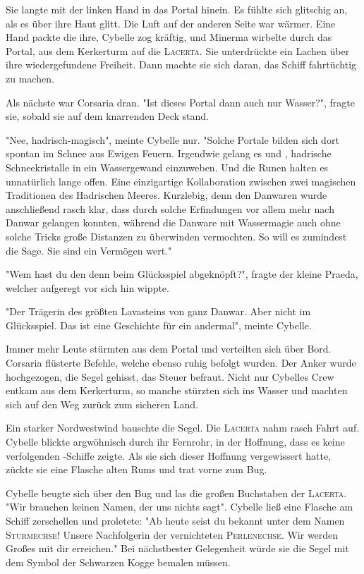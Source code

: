 Sie langte mit der linken Hand in das Portal hinein. Es fühlte sich glitschig an, als es über ihre Haut glitt. Die Luft auf der anderen Seite war wärmer. Eine Hand packte die ihre, Cybelle zog kräftig, und Minerma wirbelte durch das Portal, aus dem Kerkerturm auf die \textsc{Lacerta}. Sie unterdrückte ein Lachen über ihre wiedergefundene Freiheit. Dann machte sie sich daran, das Schiff fahrtüchtig zu machen.

Als nächste war Corsaria dran. "Ist dieses Portal dann auch nur Wasser?", fragte sie, sobald sie auf dem knarrenden Deck stand.

"Nee, hadrisch-magisch", meinte Cybelle nur. "Solche Portale bilden sich dort spontan im Schnee aus Ewigen Feuern. Irgendwie gelang es  und , hadrische Schneekristalle in ein Wassergewand einzuweben. Und die Runen halten es unnatürlich lange offen. Eine einzigartige Kollaboration zwischen zwei magischen Traditionen des Hadrischen Meeres. Kurzlebig, denn den Danwaren wurde anschließend rasch klar, dass durch solche Erfindungen vor allem mehr  nach Danwar gelangen konnten, während die Danware mit Wassermagie auch ohne solche Tricks große Distanzen zu überwinden vermochten. So will es zumindest die Sage. Sie sind ein Vermögen wert."

"Wem hast du den denn beim Glücksspiel abgeknöpft?", fragte der kleine Praeda, welcher aufgeregt vor sich hin wippte. 

"Der Trägerin des größten Lavasteins von ganz Danwar. Aber nicht im Glücksspiel. Das ist eine Geschichte für ein andermal", meinte Cybelle.

Immer mehr Leute stürmten aus dem Portal und verteilten sich über Bord. Corsaria flüsterte Befehle, welche ebenso ruhig befolgt wurden. Der Anker wurde hochgezogen, die Segel gehisst, das Steuer befraut. Nicht nur Cybelles Crew entkam aus dem Kerkerturm, so manche stürzten sich ins Wasser und machten sich auf den Weg zurück zum sicheren Land.

Ein starker Nordwestwind bauschte die Segel. Die \textsc{Lacerta} nahm rasch Fahrt auf. Cybelle blickte argwöhnisch durch ihr Fernrohr, in der Hoffnung, dass es keine verfolgenden -Schiffe zeigte. Als sie sich dieser Hoffnung vergewissert hatte, zückte sie eine Flasche alten Rums und trat vorne zum Bug.

Cybelle beugte sich über den Bug und las die großen Buchstaben der \textsc{Lacerta}. 
"Wir brauchen keinen Namen, der uns nichts sagt". Cybelle ließ eine Flasche am Schiff zerschellen und proletete: "Ab heute seist du bekannt unter dem Namen \textsc{Sturmechse}! Unsere Nachfolgerin der vernichteten \textsc{Perlenechse}. Wir werden Großes mit dir erreichen." Bei nächstbester Gelegenheit würde sie die Segel mit dem Symbol der Schwarzen Kogge bemalen müssen.

